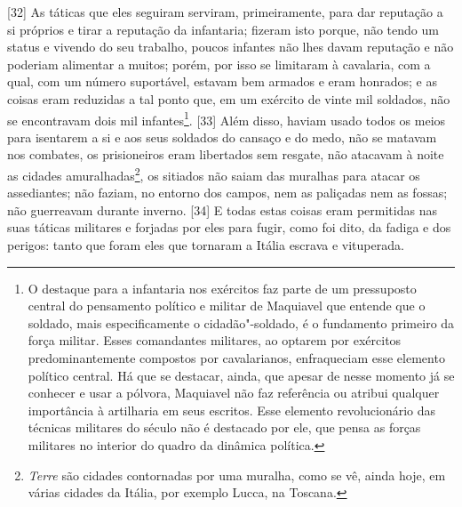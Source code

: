 {[}32{]} As táticas que eles seguiram serviram, primeiramente, para dar
reputação a si próprios e tirar a reputação da infantaria; fizeram isto
porque, não tendo um status e vivendo do seu trabalho, poucos infantes
não lhes davam reputação e não poderiam alimentar a muitos; porém, por
isso se limitaram à cavalaria, com a qual, com um número suportável,
estavam bem armados e eram honrados; e as coisas eram reduzidas a tal
ponto que, em um exército de vinte mil soldados, não se encontravam dois
mil infantes\footnote{O destaque para a infantaria nos exércitos faz
  parte de um pressuposto central do pensamento político e militar de
  Maquiavel que entende que o soldado, mais especificamente o
  cidadão"-soldado, é o fundamento primeiro da força militar. Esses
  comandantes militares, ao optarem por exércitos predominantemente
  compostos por cavalarianos, enfraqueciam esse elemento político
  central. Há que se destacar, ainda, que apesar de nesse momento já se
  conhecer e usar a pólvora, Maquiavel não faz referência ou atribui
  qualquer importância à artilharia em seus escritos. Esse elemento
  revolucionário das técnicas militares do século  não é destacado
  por ele, que pensa as forças militares no interior do quadro da
  dinâmica política.}. {[}33{]} Além disso, haviam usado todos os meios
para isentarem a si e aos seus soldados do cansaço e do medo, não se
matavam nos combates, os prisioneiros eram libertados sem resgate, não
atacavam à noite as cidades amuralhadas\footnote{\emph{Terre} são
  cidades contornadas por uma muralha, como se vê, ainda hoje, em várias
  cidades da Itália, por exemplo Lucca, na Toscana.}, os sitiados não
saiam das muralhas para atacar os assediantes; não faziam, no entorno
dos campos, nem as paliçadas nem as fossas; não guerreavam durante
inverno. {[}34{]} E todas estas coisas eram permitidas nas suas táticas
militares e forjadas por eles para fugir, como foi dito, da fadiga e dos
perigos: tanto que foram eles que tornaram a Itália escrava e vituperada.


